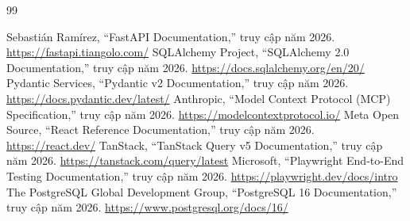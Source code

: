 \begin{thebibliography}{99}
\small
\setlength{\itemsep}{2pt}
\setlength{\parskip}{0pt}
 Sebastián Ramírez, ``FastAPI Documentation,'' truy cập năm 2026. \url{https://fastapi.tiangolo.com/}
 SQLAlchemy Project, ``SQLAlchemy 2.0 Documentation,'' truy cập năm 2026. \url{https://docs.sqlalchemy.org/en/20/}
 Pydantic Services, ``Pydantic v2 Documentation,'' truy cập năm 2026. \url{https://docs.pydantic.dev/latest/}
 Anthropic, ``Model Context Protocol (MCP) Specification,'' truy cập năm 2026. \url{https://modelcontextprotocol.io/}
 Meta Open Source, ``React Reference Documentation,'' truy cập năm 2026. \url{https://react.dev/}
 TanStack, ``TanStack Query v5 Documentation,'' truy cập năm 2026. \url{https://tanstack.com/query/latest}
 Microsoft, ``Playwright End-to-End Testing Documentation,'' truy cập năm 2026. \url{https://playwright.dev/docs/intro}
 The PostgreSQL Global Development Group, ``PostgreSQL 16 Documentation,'' truy cập năm 2026. \url{https://www.postgresql.org/docs/16/}
\end{thebibliography}
